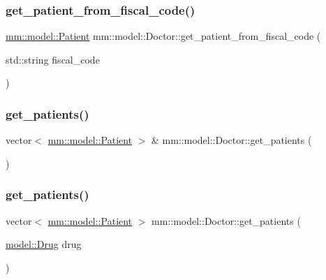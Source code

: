 \subsubsection{\texorpdfstring{get\+\_\+patient\+\_\+from\+\_\+fiscal\+\_\+code()}{get\_patient\_from\_fiscal\_code()}}
{\footnotesize\ttfamily \mbox{\hyperlink{classmm_1_1model_1_1_patient}{mm\+::model\+::\+Patient}} mm\+::model\+::\+Doctor\+::get\+\_\+patient\+\_\+from\+\_\+fiscal\+\_\+code (\begin{DoxyParamCaption}\item[{std\+::string}]{fiscal\+\_\+code }\end{DoxyParamCaption})}

\mbox{\label{classmm_1_1model_1_1_doctor_a8b761c1dfbe10348eb99c0397e811e0a}} 
\subsubsection{\texorpdfstring{get\+\_\+patients()}{get\_patients()}\hspace{0.1cm}{\footnotesize\ttfamily [1/2]}}
{\footnotesize\ttfamily vector$<$ \mbox{\hyperlink{classmm_1_1model_1_1_patient}{mm\+::model\+::\+Patient}} $>$ \& mm\+::model\+::\+Doctor\+::get\+\_\+patients (\begin{DoxyParamCaption}{ }\end{DoxyParamCaption})}

\mbox{\label{classmm_1_1model_1_1_doctor_a989fbde1a8784d8139d8add9066ab9b1}} 
\subsubsection{\texorpdfstring{get\+\_\+patients()}{get\_patients()}\hspace{0.1cm}{\footnotesize\ttfamily [2/2]}}
{\footnotesize\ttfamily vector$<$ \mbox{\hyperlink{classmm_1_1model_1_1_patient}{mm\+::model\+::\+Patient}} $>$ mm\+::model\+::\+Doctor\+::get\+\_\+patients (\begin{DoxyParamCaption}\item[{\mbox{\hyperlink{classmm_1_1model_1_1_drug}{model\+::\+Drug}}}]{drug }\end{DoxyParamCaption})}


